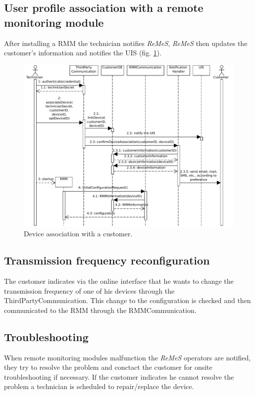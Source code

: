 \documentclass[a4paper,10pt]{article}
\newcommand{\rem}{\emph{ReMeS}\xspace}
\begin{document}
\subsection{User profile association with a remote monitoring module}
After installing a RMM the technician notifies \rem, \rem then updates the customer's information and notifies the UIS (fig. \ref{fig:seq_association}).

\begin{figure}[!htp]
    \centering
    \includegraphics[width=\textwidth]{User_profile_association_with_a_remote_monitoring_module}
    \caption{Device association with a customer.
        }\label{fig:seq_association}
\end{figure}

\subsection{Transmission frequency reconfiguration}
The customer indicates via the online interface that he wants to change the transmission frequency of one of his devices through the ThirdPartyCommunication. This change to the configuration is checked and then communicated to the RMM through the RMMCommunication.

\subsection{Troubleshooting}
When remote monitoring modules malfunction the \rem operators are notified, they try to resolve the problem and conctact the customer for onsite troubleshooting if necessary. If the customer indicates he cannot resolve the problem a technician is scheduled to repair/replace the device.
\end{document}
